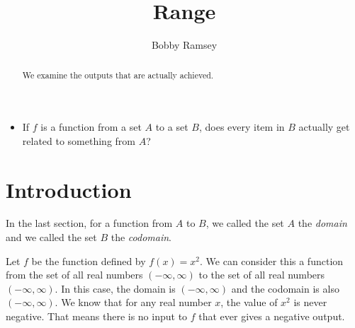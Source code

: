 \documentclass[nooutcomes]{ximera}
\author{Bobby Ramsey}
\title{Range}
\begin{document}
\begin{abstract}
 	We examine the outputs that are actually achieved.
\end{abstract}
\maketitle



\begin{motivatingQuestions}\begin{itemize}
	\item If $f$ is a function from a set $A$ to a set $B$, does every item in $B$ actually get related to something from $A$?
\end{itemize}\end{motivatingQuestions}

\section{Introduction}

	In the last section, for a function from $A$ to $B$,  we called the set $A$ the \emph{domain} and we called the set $B$ the \emph{codomain}.
	
	Let $f$ be the function defined by $f(x) = x^2$. We can consider this a function from the set of all real numbers $(-\infty, \infty)$ to the set of all 
	real numbers $(-\infty, \infty)$. In this case, the domain is $(-\infty, \infty)$ and the codomain is also $(-\infty, \infty)$.
	We know that for any real number $x$, the value of $x^2$ is never negative. That means there is no input to $f$ that ever gives a negative output.
		
\end{document}
